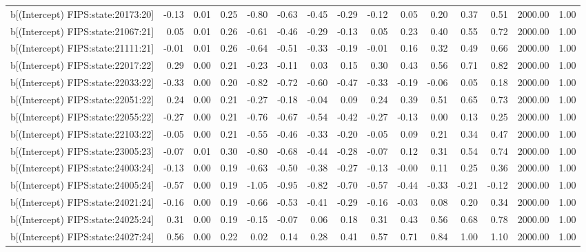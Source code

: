 \begin{table}[ht]
\begin{tabular}{rrrrrrrrrrrrrrr}
  b[(Intercept) FIPS:state:20173:20] & -0.13 & 0.01 & 0.25 & -0.80 & -0.63 & -0.45 & -0.29 & -0.12 & 0.05 & 0.20 & 0.37 & 0.51 & 2000.00 & 1.00 \\ 
  b[(Intercept) FIPS:state:21067:21] & 0.05 & 0.01 & 0.26 & -0.61 & -0.46 & -0.29 & -0.13 & 0.05 & 0.23 & 0.40 & 0.55 & 0.72 & 2000.00 & 1.00 \\ 
  b[(Intercept) FIPS:state:21111:21] & -0.01 & 0.01 & 0.26 & -0.64 & -0.51 & -0.33 & -0.19 & -0.01 & 0.16 & 0.32 & 0.49 & 0.66 & 2000.00 & 1.00 \\ 
  b[(Intercept) FIPS:state:22017:22] & 0.29 & 0.00 & 0.21 & -0.23 & -0.11 & 0.03 & 0.15 & 0.30 & 0.43 & 0.56 & 0.71 & 0.82 & 2000.00 & 1.00 \\ 
  b[(Intercept) FIPS:state:22033:22] & -0.33 & 0.00 & 0.20 & -0.82 & -0.72 & -0.60 & -0.47 & -0.33 & -0.19 & -0.06 & 0.05 & 0.18 & 2000.00 & 1.00 \\ 
  b[(Intercept) FIPS:state:22051:22] & 0.24 & 0.00 & 0.21 & -0.27 & -0.18 & -0.04 & 0.09 & 0.24 & 0.39 & 0.51 & 0.65 & 0.73 & 2000.00 & 1.00 \\ 
  b[(Intercept) FIPS:state:22055:22] & -0.27 & 0.00 & 0.21 & -0.76 & -0.67 & -0.54 & -0.42 & -0.27 & -0.13 & 0.00 & 0.13 & 0.25 & 2000.00 & 1.00 \\ 
  b[(Intercept) FIPS:state:22103:22] & -0.05 & 0.00 & 0.21 & -0.55 & -0.46 & -0.33 & -0.20 & -0.05 & 0.09 & 0.21 & 0.34 & 0.47 & 2000.00 & 1.00 \\ 
  b[(Intercept) FIPS:state:23005:23] & -0.07 & 0.01 & 0.30 & -0.80 & -0.68 & -0.44 & -0.28 & -0.07 & 0.12 & 0.31 & 0.54 & 0.74 & 2000.00 & 1.00 \\ 
  b[(Intercept) FIPS:state:24003:24] & -0.13 & 0.00 & 0.19 & -0.63 & -0.50 & -0.38 & -0.27 & -0.13 & -0.00 & 0.11 & 0.25 & 0.36 & 2000.00 & 1.00 \\ 
  b[(Intercept) FIPS:state:24005:24] & -0.57 & 0.00 & 0.19 & -1.05 & -0.95 & -0.82 & -0.70 & -0.57 & -0.44 & -0.33 & -0.21 & -0.12 & 2000.00 & 1.00 \\ 
  b[(Intercept) FIPS:state:24021:24] & -0.16 & 0.00 & 0.19 & -0.66 & -0.53 & -0.41 & -0.29 & -0.16 & -0.03 & 0.08 & 0.20 & 0.34 & 2000.00 & 1.00 \\ 
  b[(Intercept) FIPS:state:24025:24] & 0.31 & 0.00 & 0.19 & -0.15 & -0.07 & 0.06 & 0.18 & 0.31 & 0.43 & 0.56 & 0.68 & 0.78 & 2000.00 & 1.00 \\ 
  b[(Intercept) FIPS:state:24027:24] & 0.56 & 0.00 & 0.22 & 0.02 & 0.14 & 0.28 & 0.41 & 0.57 & 0.71 & 0.84 & 1.00 & 1.10 & 2000.00 & 1.00 \\ 

\end{tabular}
\end{table}
